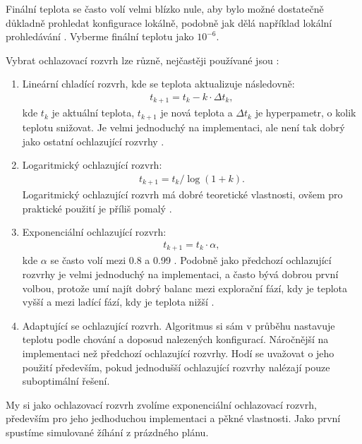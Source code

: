 Finální teplota se často volí velmi blízko nule, aby bylo možné dostatečně důkladně prohledat konfigurace lokálně, podobně jak dělá například lokální prohledávání \cite{sa_theory}.
Vyberme finální teplotu jako $10^{-6}$.

Vybrat ochlazovací rozvrh lze různě, nejčastěji používané jsou \cite{sa_theory}:
\begin{enumerate}
  \item Lineární chladící rozvrh, kde se teplota aktualizuje následovně:
    \begin{align*}
      t_{k+1} = t_k - k \cdot \Delta t_k,
    \end{align*}
    kde $t_k$ je aktuální teplota, $t_{k+1}$ je nová teplota a $\Delta t_k$ je hyperpametr, o kolik teplotu snižovat.
    Je velmi jednoduchý na implementaci, ale není tak dobrý jako ostatní ochlazující rozvrhy \cite{sa_schedules}.

  \item Logaritmický ochlazující rozvrh:
    \begin{align*}
      t_{k+1} = t_{k} / \log(1 + k).
    \end{align*}
    Logaritmický ochlazující rozvrh má dobré teoretické vlastnosti, ovšem pro praktické použití je příliš pomalý \cite{sa_schedules}.

  \item Exponenciální ochlazující rozvrh:
    \begin{align*}
      t_{k+1} = t_k \cdot \alpha,
    \end{align*}
    kde $\alpha$ se často volí mezi 0.8 a 0.99 \cite{sa_theory}.
    Podobně jako předchozí ochlazující rozvrhy je velmi jednoduchý na implementaci, a často bývá dobrou první volbou, protože umí najít dobrý balanc mezi explorační fází,
    kdy je teplota vyšší a mezi ladící fází, kdy je teplota nižší \cite{sa_theory}.

  \item Adaptující se ochlazující rozvrh. Algoritmus si sám v průběhu nastavuje teplotu podle chování a doposud nalezených konfigurací.
    Náročnější na implementaci než předchozí ochlazující rozvrhy. Hodí se uvažovat o jeho použití především, pokud jednodušší ochlazující rozvrhy nalézají pouze suboptimální řešení.
\end{enumerate}

My si jako ochlazovací rozvrh zvolíme exponenciální ochlazovací rozvrh, především pro jeho jedhoduchou implementaci a pěkné vlastnosti.
Jako první spustíme simulované žíhání z prázdného plánu.

